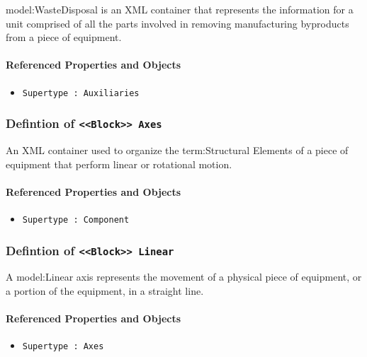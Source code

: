 {model:WasteDisposal} is an XML container that represents the information for a unit comprised of all the parts involved in removing manufacturing byproducts from a piece of equipment.


\FloatBarrier
\paragraph{Referenced Properties and Objects}

\begin{itemize}
\item \texttt{Supertype : Auxiliaries}

\end{itemize}
\FloatBarrier
\subsubsection{Defintion of \texttt{<<Block>> Axes}}
  \label{type:Axes}

\FloatBarrier

An XML container used to organize the {term:Structural Elements} of a piece of equipment that perform linear or rotational motion.

\FloatBarrier
\paragraph{Referenced Properties and Objects}

\begin{itemize}
\item \texttt{Supertype : Component}

\end{itemize}
\FloatBarrier
\subsubsection{Defintion of \texttt{<<Block>> Linear}}
  \label{type:Linear}

\FloatBarrier

A {model:Linear} axis represents the movement of a physical piece of equipment, or a portion of the equipment, in a straight line. 

\FloatBarrier
\paragraph{Referenced Properties and Objects}

\begin{itemize}
\item \texttt{Supertype : Axes}

\end{itemize}
\FloatBarrier
